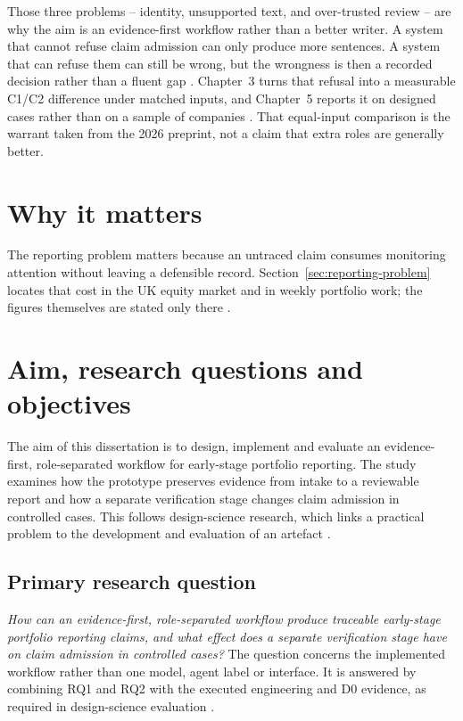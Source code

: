 Those three problems -- identity, unsupported text, and over-trusted review -- are why the aim is an
evidence-first workflow rather than a better writer. A system that cannot refuse claim admission can
only produce more sentences. A system that can refuse them can still be wrong, but the wrongness is
then a recorded decision rather than a fluent gap \citep{gao2023alce,nist2023airmf}. Chapter~3 turns
that refusal into a measurable C1/C2 difference under matched inputs, and Chapter~5 reports it on
designed cases rather than on a sample of companies \citep{ribeiro2020checklist,fu2026agents}. That
equal-input comparison is the warrant taken from the 2026 preprint, not a claim that extra roles are
generally better.

\section{Why it matters}

The reporting problem matters because an untraced claim consumes monitoring attention without leaving
a defensible record. Section~\ref{sec:reporting-problem} locates that cost in the UK equity market
and in weekly portfolio work; the figures themselves are stated only there
\citep{britishbusinessbank2025equity,gompers2016vcdecisions}.

\section{Aim, research questions and objectives}
\label{sec:research-questions}

The aim of this dissertation is to design, implement and evaluate an evidence-first, role-separated
workflow for early-stage portfolio reporting. The study examines how the prototype preserves evidence
from intake to a reviewable report and how a separate verification stage changes claim admission in
controlled cases. This follows design-science research, which links a practical problem to the
development and evaluation of an artefact \citep{hevner2004design,peffers2007dsrm}.

\subsection*{Primary research question}

\textit{How can an evidence-first, role-separated workflow produce traceable early-stage portfolio
reporting claims, and what effect does a separate verification stage have on claim admission in
controlled cases?} The question concerns the implemented workflow rather than one model, agent label
or interface. It is answered by combining RQ1 and RQ2 with the executed engineering and D0 evidence,
as required in design-science evaluation \citep{hevner2004design,peffers2007dsrm}.

